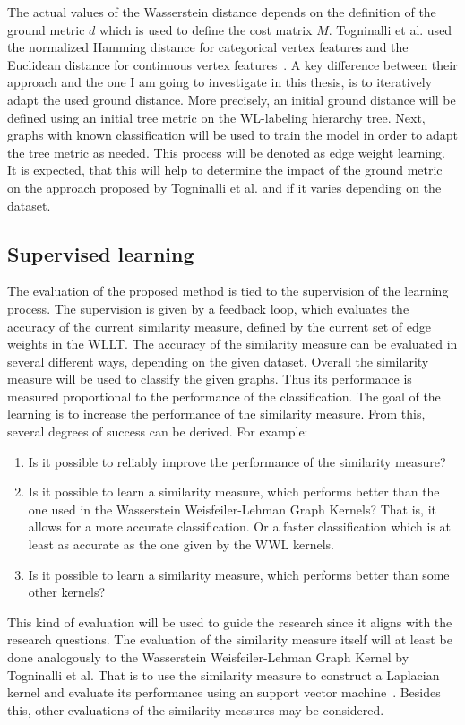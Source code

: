 The actual values of the Wasserstein distance depends on the definition of the ground metric $d$ which is used to define the cost matrix $M$. 
Togninalli et al. used the normalized Hamming distance for categorical vertex features and the Euclidean distance for continuous vertex features~\cite{2019_Togninalli_NIPS}. 
A key difference between their approach and the one I am going to investigate in this thesis, is to iteratively adapt the used ground distance. 
More precisely, an initial ground distance will be defined using an initial tree metric on the WL-labeling hierarchy tree. 
Next, graphs with known classification will be used to train the model in order to adapt the tree metric as needed. 
This process will be denoted as edge weight learning. %
It is expected, that this will help to determine the impact of the ground metric on the approach proposed by Togninalli et al. and if it varies depending on the dataset.

\subsection{Supervised learning}

The evaluation of the proposed method is tied to the supervision of the learning process. 
The supervision is given by a feedback loop, which evaluates the accuracy of the current similarity measure, defined by the current set of edge weights in the WLLT. 
The accuracy of the similarity measure can be evaluated in several different ways, depending on the given dataset.
Overall the similarity measure will be used to classify the given graphs.
Thus its performance is measured proportional to the performance of the classification.
The goal of the learning is to increase the performance of the similarity measure. 
From this, several degrees of success can be derived. For example:
\begin{enumerate}
	\item Is it possible to reliably improve the performance of the similarity measure?
	\item Is it possible to learn a similarity measure, which performs better than the one used in the Wasserstein Weisfeiler-Lehman Graph Kernels? That is, it allows for a more accurate classification. Or a faster classification which is at least as accurate as the one given by the WWL kernels.
	\item Is it possible to learn a similarity measure, which performs better than some other kernels?
\end{enumerate} 
This kind of evaluation will be used to guide the research since it aligns with the research questions.
The evaluation of the similarity measure itself will at least be done analogously to the Wasserstein Weisfeiler-Lehman Graph Kernel by Togninalli et al. 
That is to use the similarity measure to construct a Laplacian kernel and evaluate its performance using an support vector machine~\cite{2019_Togninalli_NIPS}.
Besides this, other evaluations of the similarity measures may be considered.

